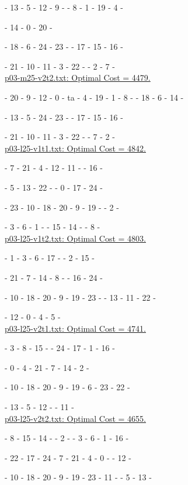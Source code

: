 \ta - 13 - 5 - 12 - 9 - \ta - 8 - 1 - 19 - 4 - \ta

\ta - 14 - 0 - 20 - \ta

\te - 18 - 6 - 24 - 23 - \te - 17 - 15 - 16 - \te 

\te - 21 - 10 - 11 - 3 - 22 - \te - 2 - 7 - \te
\\ 

\underline{p03-m25-v2t2.txt: Optimal Cost = 4479. }
 
\ta - 20 - 9 - 12 - 0 - ta - 4 - 19 - 1 - 8 - \ta - 18 - 6 - 14 - \ta

\te - 13 - 5 - 24 - 23 - \te - 17 - 15 - 16 -\te 

\te - 21 - 10 - 11 - 3 - 22 - \te - 7 - 2 -  \te
\\
  
\underline{p03-l25-v1t1.txt: Optimal Cost = 4842.} 

\ta - 7 - 21 - 4 - 12 - 11 - \ta - 16 - \ta

\ta - 5 - 13 - 22 - \ta - 0 - 17 - 24 - \ta

\tc - 23 - 10 - 18 - 20 - 9 - 19 - \tc - 2 - \tc

\tc - 3 - 6 - 1 - \tc - 15 - 14 - \tc - 8 - \tc
\\

\underline{p03-l25-v1t2.txt: Optimal Cost = 4803.} 

\ta - 1 - 3 - 6 - 17 - \ta - 2 - 15 - \ta

\ta - 21 - 7 - 14 - 8 - \ta - 16 - 24 - \ta

\te - 10 - 18 - 20 - 9 - 19 - 23 - \te - 13 - 11 - 22 - \te

\te - 12 - 0 - 4 - 5 - \te
\\

\underline{p03-l25-v2t1.txt: Optimal Cost = 4741.} 

\ta - 3 - 8 - 15 - \ta - 24 - 17 - 1 - 16 - \ta

\ta - 0 - 4 - 21 - 7 - 14 - 2 - \ta

\te - 10 - 18 - 20 - 9 - 19 - 6 - 23 - 22 - \te

\te - 13 - 5 - 12 - \te - 11 - \te
\\

\underline{p03-l25-v2t2.txt: Optimal Cost = 4655.} 

\tc - 8 - 15 - 14 - \tc - 2 - \tc - 3 - 6 - 1 - 16 - \tc

\te - 22 - 17 - 24 - 7 - 21 - 4 - 0 - \te - 12 - \te

\te - 10 - 18 - 20 - 9 - 19 - 23 - 11 - \te - 5 - 13 - \te
\\

